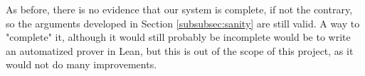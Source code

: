 \medskip

As before, there is no evidence that our system is complete, if not the
contrary, so the arguments developed in Section \ref{subsubsec:sanity} are
still valid.
A way to "complete" it, although it would still probably be incomplete would be
to write an automatized prover in Lean, but this is out of the scope of this
project, as it would not do many improvements.
